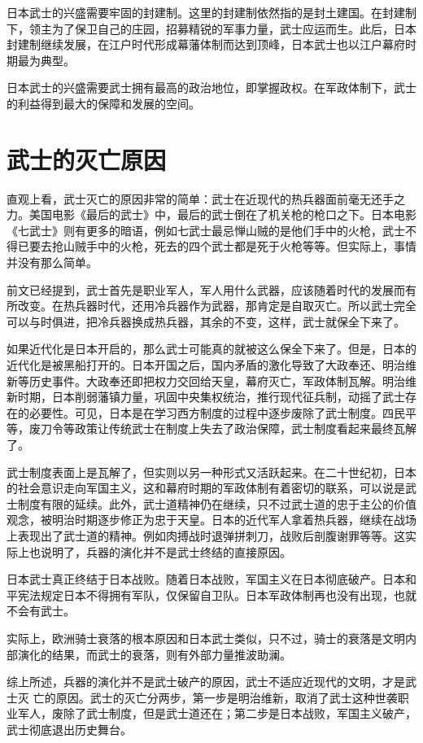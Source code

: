\documentclass[utf8,a4paper]{ctexart}
\begin{document}
日本武士的兴盛需要牢固的封建制。这里的封建制依然指的是封土建国。在封建制下，领主为了保卫自己的庄园，招募精锐的军事力量，武士应运而生。此后，日本封建制继续发展，在江户时代形成幕藩体制而达到顶峰，日本武士也以江户幕府时期最为典型。

日本武士的兴盛需要武士拥有最高的政治地位，即掌握政权。在军政体制下，武士的利益得到最大的保障和发展的空间。

\section{武士的灭亡原因}
直观上看，武士灭亡的原因非常的简单：武士在近现代的热兵器面前毫无还手之力。美国电影《最后的武士》中，最后的武士倒在了机关枪的枪口之下。日本电影《七武士》则有更多的暗语，例如七武士最忌惮山贼的是他们手中的火枪，武士不得已要去抢山贼手中的火枪，死去的四个武士都是死于火枪等等。但实际上，事情并没有那么简单。

前文已经提到，武士首先是职业军人，军人用什么武器，应该随着时代的发展而有所改变。在热兵器时代，还用冷兵器作为武器，那肯定是自取灭亡。所以武士完全可以与时俱进，把冷兵器换成热兵器，其余的不变，这样，武士就保全下来了。

如果近代化是日本开启的，那么武士可能真的就被这么保全下来了。但是，日本的近代化是被黑船打开的。日本开国之后，国内矛盾的激化导致了大政奉还、明治维新等历史事件。大政奉还即把权力交回给天皇，幕府灭亡，军政体制瓦解。明治维新时期，日本削弱藩镇力量，巩固中央集权统治，推行现代征兵制，动摇了武士存在的必要性。可见，日本是在学习西方制度的过程中逐步废除了武士制度。四民平等，废刀令等政策让传统武士在制度上失去了政治保障，武士制度看起来最终瓦解了。

武士制度表面上是瓦解了，但实则以另一种形式又活跃起来。在二十世纪初，日本的社会意识走向军国主义，这和幕府时期的军政体制有着密切的联系，可以说是武士制度有限的延续。此外，武士道精神仍在继续，只不过武士道的忠于主公的价值观念，被明治时期逐步修正为忠于天皇。日本的近代军人拿着热兵器，继续在战场上表现出了武士道的精神。例如肉搏战时退弹拼刺刀，战败后剖腹谢罪等等。这实际上也说明了，兵器的演化并不是武士终结的直接原因。

日本武士真正终结于日本战败。随着日本战败，军国主义在日本彻底破产。日本和平宪法规定日本不得拥有军队，仅保留自卫队。日本军政体制再也没有出现，也就不会有武士。

实际上，欧洲骑士衰落的根本原因和日本武士类似，只不过，骑士的衰落是文明内部演化的结果，而武士的衰落，则有外部力量推波助澜。

综上所述，兵器的演化并不是武士破产的原因，武士不适应近现代的文明，才是武士灭	亡的原因。武士的灭亡分两步，第一步是明治维新，取消了武士这种世袭职业军人，废除了武士制度，但是武士道还在；第二步是日本战败，军国主义破产，武士彻底退出历史舞台。
\end{document}

